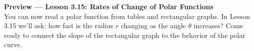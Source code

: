 \documentclass[10pt]{article}
\begin{document}
\vspace{0.08in}

\begin{tcolorbox}[colback=navylight, colframe=navy, arc=2mm,
    left=3mm, right=3mm, top=2mm, bottom=2mm]
\small\textbf{Preview --- Lesson 3.15: Rates of Change of Polar Functions}\\
You can now read a polar function from tables and rectangular graphs. In Lesson 3.15
we'll ask: how fast is the radius $r$ changing as the angle $\theta$ increases?
Come ready to connect the slope of the rectangular graph to the behavior of the
polar curve.
\end{tcolorbox}
\end{document}
